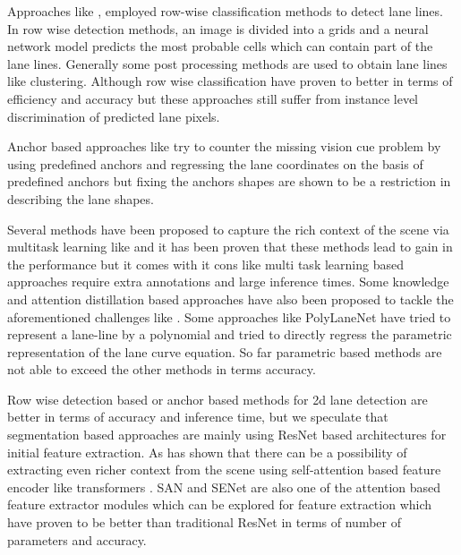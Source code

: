  Approaches like \cite{DBLP:journals/corr/abs-2005-08630}, \cite{DBLP:journals/corr/abs-2004-11757} employed row-wise classification methods to detect lane lines. In row wise detection methods, an image is divided into a grids and a neural network model predicts the most probable cells which can contain part of the lane lines. Generally some post processing methods are used to obtain lane lines like clustering. Although row wise classification have proven to better in terms of efficiency and accuracy but these approaches still suffer from instance level discrimination of predicted lane pixels.
 
 Anchor based approaches like  \cite{https://doi.org/10.48550/arxiv.2010.12035} try to counter the missing vision cue problem by using predefined anchors and regressing the lane coordinates on the basis of predefined anchors but fixing the anchors shapes are shown to be a restriction in describing the lane shapes.

Several methods have been proposed to capture the rich context of the scene via multitask learning like \cite{inbook} and it has been proven that these methods lead to gain in the performance but it comes with it cons like multi task learning based approaches require extra annotations and large inference times. Some knowledge and attention distillation based approaches have also been proposed to tackle the aforementioned challenges like \cite{DBLP:journals/corr/abs-1908-00821}. Some approaches like PolyLaneNet\cite{DBLP:journals/corr/abs-2004-10924} have tried  to represent a lane-line by a polynomial and tried to directly regress the parametric representation of the lane curve equation. So far parametric based methods are not able to exceed the other methods in terms accuracy.

Row wise detection based or anchor based methods for 2d lane detection are better in terms of accuracy and inference time, but we speculate that segmentation based approaches are mainly using ResNet\cite{DBLP:journals/corr/HeZRS15} based architectures for initial feature extraction. As \cite{DBLP:journals/corr/abs-2105-05003} has shown that there can be a possibility of extracting even richer context from the scene using self-attention based feature encoder like transformers \cite{https://doi.org/10.48550/arxiv.1706.03762}.   SAN\cite{DBLP:journals/corr/abs-2004-13621} and SENet\cite{DBLP:journals/corr/abs-1709-01507} are also one of the attention based feature extractor modules which can be explored for feature extraction which have proven to be better than traditional ResNet\cite{DBLP:journals/corr/HeZRS15} in terms of number of parameters and accuracy. 

